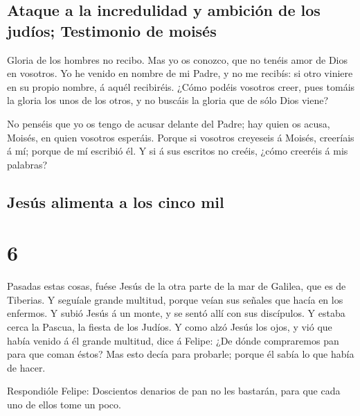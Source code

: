 \hypertarget{ataque-a-la-incredulidad-y-ambiciuxf3n-de-los-juduxedos-testimonio-de-moisuxe9s}{%
\subsection{Ataque a la incredulidad y ambición de los judíos;
Testimonio de
moisés}\label{ataque-a-la-incredulidad-y-ambiciuxf3n-de-los-juduxedos-testimonio-de-moisuxe9s}}

 Gloria de los hombres no recibo.  Mas yo
os conozco, que no tenéis amor de Dios en vosotros.  Yo
he venido en nombre de mi Padre, y no me recibís: si otro viniere en su
propio nombre, á aquél recibiréis.  ¿Cómo podéis vosotros
creer, pues tomáis la gloria los unos de los otros, y no buscáis la
gloria que de sólo Dios viene?

 No penséis que yo os tengo de acusar delante del Padre;
hay quien os acusa, Moisés, en quien vosotros esperáis. 
Porque si vosotros creyeseis á Moisés, creeríais á mí; porque de mí
escribió él.  Y si á sus escritos no creéis, ¿cómo
creeréis á mis palabras?

\hypertarget{jesuxfas-alimenta-a-los-cinco-mil}{%
\subsection{Jesús alimenta a los cinco
mil}\label{jesuxfas-alimenta-a-los-cinco-mil}}

\hypertarget{section-43-6}{%
\section{6}\label{section-43-6}}

 Pasadas estas cosas, fuése Jesús de la otra parte de la
mar de Galilea, que es de Tiberias.  Y seguíale grande
multitud, porque veían sus señales que hacía en los enfermos.
 Y subió Jesús á un monte, y se sentó allí con sus
discípulos.  Y estaba cerca la Pascua, la fiesta de los
Judíos.  Y como alzó Jesús los ojos, y vió que había
venido á él grande multitud, dice á Felipe: ¿De dónde compraremos pan
para que coman éstos?  Mas esto decía para probarle;
porque él sabía lo que había de hacer.

 Respondióle Felipe: Doscientos denarios de pan no les
bastarán, para que cada uno de ellos tome un poco.

